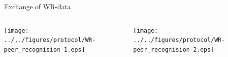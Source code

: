 \documentclass[compress,red]{beamer}
\begin{document}
% 
% 
% 
% 
% 
% 
% 
\begin{frame}{Exchange of WR-data}

  \begin{columns}[c]

    \begin{center}
    \texttt{[image: ../../figures/protocol/WR-peer\_recognision-1.eps]}
    \end{center}


    \begin{center}
    \texttt{[image: ../../figures/protocol/WR-peer\_recognision-2.eps]}
    \end{center}

  \end{columns}

\end{frame}
\end{document}
